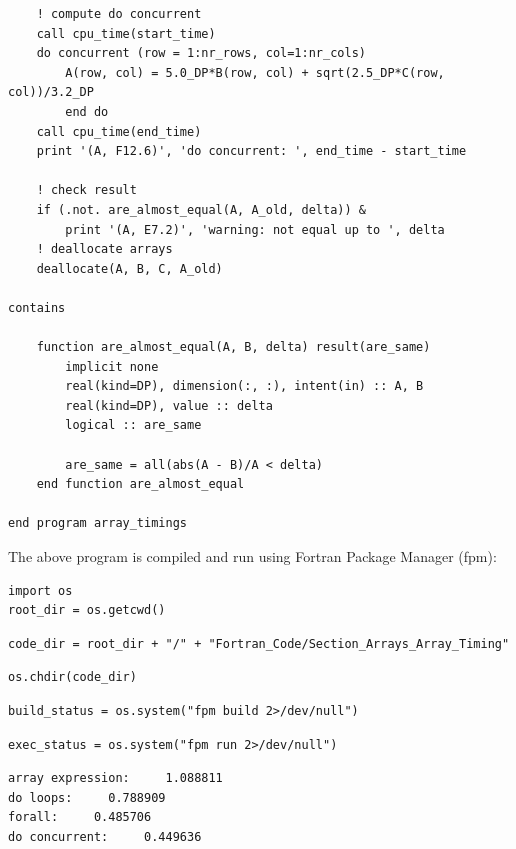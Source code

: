 \begin{verbatim}
    ! compute do concurrent
    call cpu_time(start_time)
    do concurrent (row = 1:nr_rows, col=1:nr_cols)
        A(row, col) = 5.0_DP*B(row, col) + sqrt(2.5_DP*C(row, col))/3.2_DP
        end do
    call cpu_time(end_time)
    print '(A, F12.6)', 'do concurrent: ', end_time - start_time

    ! check result
    if (.not. are_almost_equal(A, A_old, delta)) &
        print '(A, E7.2)', 'warning: not equal up to ', delta
    ! deallocate arrays
    deallocate(A, B, C, A_old)
    
contains

    function are_almost_equal(A, B, delta) result(are_same)
        implicit none
        real(kind=DP), dimension(:, :), intent(in) :: A, B
        real(kind=DP), value :: delta
        logical :: are_same

        are_same = all(abs(A - B)/A < delta)
    end function are_almost_equal

end program array_timings
\end{verbatim}

The above program is compiled and run using Fortran Package Manager (fpm):

\begin{verbatim}
import os
root_dir = os.getcwd()
\end{verbatim}

\begin{verbatim}
code_dir = root_dir + "/" + "Fortran_Code/Section_Arrays_Array_Timing"
\end{verbatim}

\begin{verbatim}
os.chdir(code_dir)
\end{verbatim}

\begin{verbatim}
build_status = os.system("fpm build 2>/dev/null")
\end{verbatim}

\begin{verbatim}
exec_status = os.system("fpm run 2>/dev/null")
\end{verbatim}

\begin{verbatim}
array expression:     1.088811
do loops:     0.788909
forall:     0.485706
do concurrent:     0.449636
\end{verbatim}